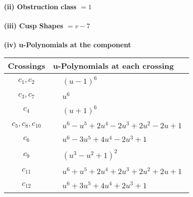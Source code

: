 \documentclass[1p]{elsarticle_modified}
\theoremstyle{definition}
\begin{document}
\flushleft \textbf{(ii) Obstruction class $= 1$}\\~\\
\flushleft \textbf{(iii) Cusp Shapes $= v-7$}\\~\\
\newpage\renewcommand{\arraystretch}{1}
\flushleft \textbf{(iv) u-Polynomials at the component}\newline \\
\begin{tabular}{m{50pt}|m{274pt}}
Crossings & \hspace{64pt}u-Polynomials at each crossing \\
\hline $$\begin{aligned}c_{1},c_{2}\end{aligned}$$&$\begin{aligned}
&(u-1)^6
\end{aligned}$\\
\hline $$\begin{aligned}c_{3},c_{7}\end{aligned}$$&$\begin{aligned}
&u^6
\end{aligned}$\\
\hline $$\begin{aligned}c_{4}\end{aligned}$$&$\begin{aligned}
&(u+1)^6
\end{aligned}$\\
\hline $$\begin{aligned}c_{5},c_{8},c_{10}\end{aligned}$$&$\begin{aligned}
&u^6- u^5+2 u^4-2 u^3+2 u^2-2 u+1
\end{aligned}$\\
\hline $$\begin{aligned}c_{6}\end{aligned}$$&$\begin{aligned}
&u^6-3 u^5+4 u^4-2 u^3+1
\end{aligned}$\\
\hline $$\begin{aligned}c_{9}\end{aligned}$$&$\begin{aligned}
&(u^3- u^2+1)^2
\end{aligned}$\\
\hline $$\begin{aligned}c_{11}\end{aligned}$$&$\begin{aligned}
&u^6+u^5+2 u^4+2 u^3+2 u^2+2 u+1
\end{aligned}$\\
\hline $$\begin{aligned}c_{12}\end{aligned}$$&$\begin{aligned}
&u^6+3 u^5+4 u^4+2 u^3+1
\end{aligned}$\\
\hline
\end{tabular}\\~\\
\end{document}
